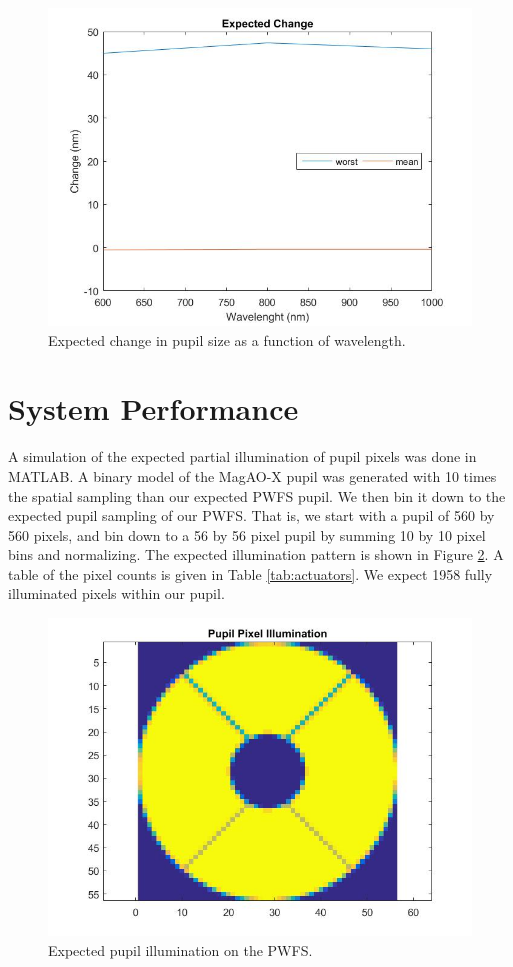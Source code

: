 	
\begin{figure}[h]
	\centering
	\includegraphics[width=.5\textwidth]{Chapter Materials/Chapter Three Materials/achromaticchangegraph.jpg}
	\caption{Expected change in pupil size as a function of wavelength.}
	\label{fig:change}
\end{figure}
	
\section{System Performance}
	
A simulation of the expected partial illumination of pupil pixels was done in MATLAB. A binary model of the MagAO-X pupil was generated with 10 times the spatial sampling than our expected PWFS pupil. We then bin it down to the expected pupil sampling of our PWFS. That is, we start with a pupil of 560 by 560 pixels, and bin down to a 56 by 56 pixel pupil by summing 10 by 10 pixel bins and normalizing. The expected illumination pattern is shown in Figure \ref{fig: pupilpixels}. A table of the pixel counts is given in Table \ref{tab:actuators}. We expect 1958 fully illuminated pixels within our pupil. 
	
	
\begin{figure}%
	\centering
	\includegraphics[width=.4\textwidth]{Chapter Materials/Chapter Three Materials/pupilpixels.jpg}
	\caption{Expected pupil illumination on the PWFS.}	
	\label{fig: pupilpixels}
\end{figure}
	
	
	
